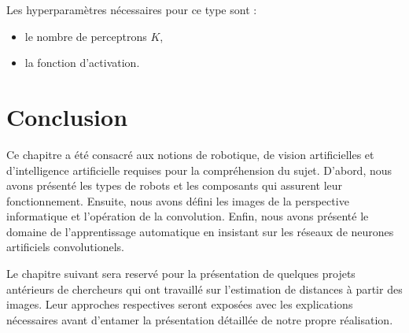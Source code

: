 Les hyperparamètres nécessaires pour ce type sont :

\begin{itemize}
  \item le nombre de perceptrons $K$,
  \item la fonction d'activation.
\end{itemize}

\section{Conclusion}

Ce chapitre a été consacré aux notions de robotique, de vision artificielles
et d'intelligence artificielle requises pour la compréhension du sujet.
D'abord, nous avons présenté les types de robots et les composants qui assurent leur
fonctionnement. Ensuite, nous avons défini les images de la perspective
informatique et l'opération de la convolution. Enfin, nous avons présenté le
domaine de l'apprentissage automatique en insistant sur les réseaux de
neurones artificiels convolutionels.

Le chapitre suivant sera reservé pour la présentation de quelques projets antérieurs
de chercheurs qui ont travaillé sur l'estimation de distances à partir des images.
Leur approches respectives seront exposées avec les explications nécessaires avant
d'entamer la présentation détaillée de notre propre réalisation.
